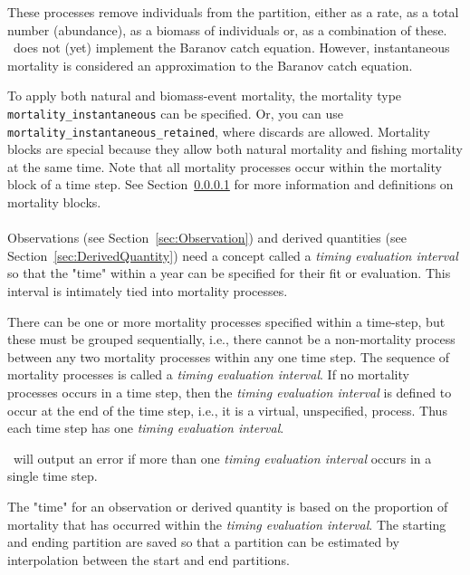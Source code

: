 These processes remove individuals from the partition, either as a rate, as a total number (abundance), as a biomass of individuals or, as a combination of these. \CNAME\ does not (yet) implement the Baranov catch equation. However, instantaneous mortality is considered an approximation to the Baranov catch equation.

To apply both natural and biomass-event mortality, the mortality type \texttt{mortality\_instantaneous} can be specified. Or, you can use \texttt{mortality\_instantaneous\_retained}, where discards are allowed. Mortality blocks are special because they allow both natural mortality and fishing mortality at the same time. Note that all mortality processes occur within the mortality block of a time step. See Section~\ref{sec:MortalityBlock} for more information and definitions on mortality blocks.


\paragraph{}\label{sec:MortalityBlock}\label{sec:TimingEvaluationInterval}


Observations (see Section~\ref{sec:Observation})  and derived quantities (see Section~\ref{sec:DerivedQuantity}) need a concept called a \emph{timing evaluation interval} so that the "time" within a year can be specified for their fit or evaluation. This interval is intimately tied into mortality processes.

There can be one or more mortality processes specified within a time-step, but these must be grouped sequentially, i.e., there cannot be a non-mortality process between any two mortality processes within any one time step. The sequence of mortality processes is called a \emph{timing evaluation interval}. If no mortality processes occurs in a time step, then the \emph{timing evaluation interval} is defined to occur at the end of the time step, i.e., it is a virtual, unspecified,  process. Thus  each time step has one \emph{timing evaluation interval}.

\CNAME\ will output an error if more than one \textit{timing evaluation interval} occurs in a single time step.

The "time" for an observation or derived quantity is based on the proportion of mortality that has occurred within the \textit{timing evaluation interval}. The starting and ending partition are saved so that a partition can be estimated by  interpolation between the start and end partitions.

